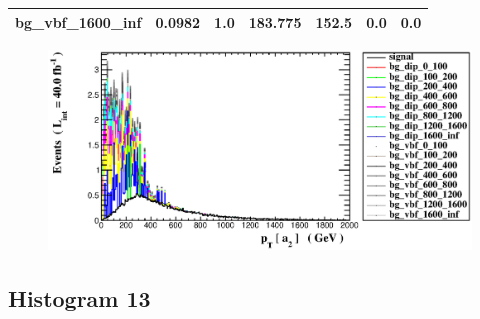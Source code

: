 \documentclass[a4paper, 10pt]{article}
\begin{document}
\begin{table}[H]
\begin{center}
\begin{tabular}{|m{23.0mm}|m{23.0mm}|m{18.0mm}|m{19.0mm}|m{19.0mm}|m{19.0mm}|m{19.0mm}|}
      \hline
      {\cellcolor{white}         bg\_vbf\_1600\_inf}& {\cellcolor{white}         0.0982}& {\cellcolor{white}         1.0}& {\cellcolor{white}         183.775}& {\cellcolor{white}         152.5}& {\cellcolor{green}         0.0}& {\cellcolor{green}         0.0}\\
\hline
    \end{tabular}
  \end{center}
\end{table}

\begin{figure}[H]
  \begin{center}
    \includegraphics[scale=0.45]{selection_11.eps}\\
\caption{   }
  \end{center}
\end{figure}
      \newpage
\subsection{ Histogram 13}
\end{document}
